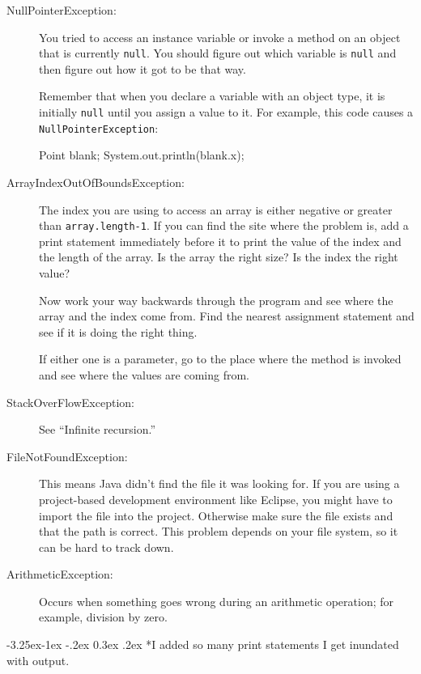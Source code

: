 \documentclass[12pt]{book}
\makeatletter
\theoremstyle{exercise}
\newcommand{\java}[1]{\verb"#1"}
\renewcommand\subsection{\@startsection{subsection}{2}{\z@}%
    {-3.25ex\@plus -1ex \@minus -.2ex}%
    {0.3ex \@plus .2ex}%
    {\normalfont\large\bfseries}}
\newcommand{\java}[1]{\lstinline{#1}} %
\makeatother
\begin{document}
\begin{description}

\item[NullPointerException:] You tried to access an instance variable or invoke a method on an object that is currently {\tt null}.
You should figure out which variable is {\tt null} and then figure out how it got to be that way.

Remember that when you declare a variable with an object type, it is initially {\tt null} until you assign a value to it.
For example, this code causes a \java{NullPointerException}:

\begin{code}
Point blank;
System.out.println(blank.x);
\end{code}

\item[ArrayIndexOutOfBoundsException:] The index you are using to access an array is either negative or greater than {\tt array.length-1}.  If you can find the site where the problem is, add a print statement immediately before it to print the value of the index and the length of the array.
Is the array the right size?
Is the index the right value?

Now work your way backwards through the program and see where the array and the index come from.
Find the nearest assignment statement and see if it is doing the right thing.

If either one is a parameter, go to the place where the method is invoked and see where the values are coming from.

\item[StackOverFlowException:] See ``Infinite recursion.''

\item[FileNotFoundException:] This means Java didn't find the file
it was looking for.
If you are using a project-based development environment like Eclipse, you might have to import the file into the project.
Otherwise make sure the file exists and that the path is correct.
This problem depends on your file system, so it can be hard to track down.

\item[ArithmeticException:] Occurs when something goes wrong during an arithmetic operation; for example, division by zero.

\end{description}


\subsection*{I added so many print statements I get inundated with
output.}
\end{document}
